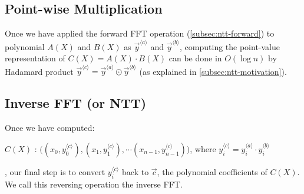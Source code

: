 


\subsection{Point-wise Multiplication}
\label{subsec:pointwise-multiplication}

Once we have applied the forward FFT operation (\autoref{subsec:ntt-forward}) to polynomial $A(X)$ and $B(X)$ as $\vec{y}^{\langle a \rangle}$ and $\vec{y}^{\langle b \rangle}$, computing the point-value representation of $C(X) = A(X) \cdot B(X)$ can be done in $O(\log n)$ by Hadamard product $ \vec{y}^{\langle c \rangle} = \vec{y}^{\langle a \rangle} \odot \vec{y}^{\langle b \rangle}$ (as explained in \autoref{subsec:ntt-motivation}).

\subsection{Inverse FFT (or NTT)}
\label{subsec:ntt-backward}

Once we have computed:

$C(X)$ : $\bm ( ({x}_0, {y}_0^{\langle c \rangle}), ({x}_1, {y}_1^{\langle c \rangle}), \cdots ({x}_{n-1}, {y}_{n-1}^{\langle c \rangle}) \bm )$, where ${y}_i^{\langle c \rangle} = {y}_i^{\langle a \rangle} \cdot {y}_i^{\langle b \rangle}$

, our final step is to convert ${y}_i^{\langle c \rangle}$ back to $\vec{c}$, the polynomial coefficients of $C(X)$. We call this reversing operation the inverse FFT. 

